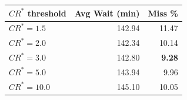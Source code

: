\begin{tabular}{lrr}
\toprule
\textbf{$CR^{*}$ threshold} & \textbf{Avg Wait (min)} & \textbf{Miss \%} \\
\midrule
$CR^{*}=1.5$ & 142.94 & 11.47 \\
$CR^{*}=2.0$ & 142.34 & 10.14 \\
$CR^{*}=3.0$ & 142.80 & \textbf{9.28} \\
$CR^{*}=5.0$ & 143.94 & 9.96 \\
$CR^{*}=10.0$ & 145.10 & 10.05 \\
\bottomrule
\end{tabular}
